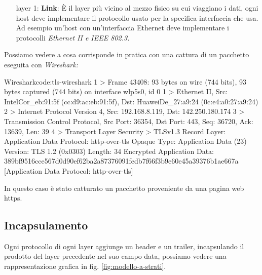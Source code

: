\begin{enumerate}
    \item[layer 1:] \textbf{Link}: È il layer più vicino al mezzo fisico su cui viaggiano i dati, ogni host deve implementare il protocollo usato per la specifica interfaccia che usa. Ad esempio un'host con un'interfaccia Ethernet deve implementare i protocolli \it{Ethernet II} e \it{IEEE 802.3}.
    

\end{enumerate}

Possiamo vedere a cosa corrisponde in pratica con una cattura di un pacchetto eseguita con \it{Wireshark}:

\begin{bashcode}{Wireshark}{code:tls-wireshark}
1 > Frame 43408: 93 bytes on wire (744 bits), 93 bytes captured (744 bits) on interface wlp5s0, id 0
1 > Ethernet II, Src: IntelCor_eb:91:5f (cc:d9:ac:eb:91:5f), Dst: HuaweiDe_27:a9:24 (0c:e4:a0:27:a9:24)
2 > Internet Protocol Version 4, Src: 192.168.8.119, Dst: 142.250.180.174
3 > Transmission Control Protocol, Src Port: 36354, Dst Port: 443, Seq: 36720, Ack: 13639, Len: 39
4 > Transport Layer Security
     > TLSv1.3 Record Layer: Application Data Protocol: http-over-tls
             Opaque Type: Application Data (23)
             Version: TLS 1.2 (0x0303)
             Length: 34
             Encrypted Application Data: 389bf9516cce567d0d90ef62ba2a87376091fedb7f66f3b9e60e45a39376b1ae667a
             [Application Data Protocol: http-over-tls]
\end{bashcode}

In questo caso è stato catturato un pacchetto proveniente da una pagina web https.

\subsection{Incapsulamento}

Ogni protocollo di ogni layer aggiunge un header e un trailer, incapsulando il prodotto del layer precedente nel suo campo data, possiamo vedere una rappresentazione grafica in fig. \ref{fig:modello-a-strati}.

